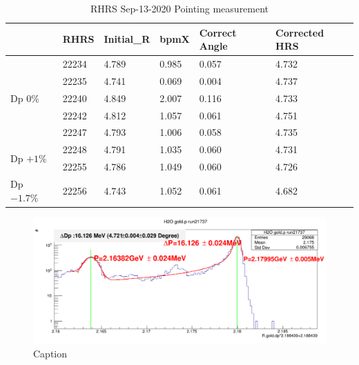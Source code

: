 \begin{table}[!ht]
    \caption{RHRS Sep-13-2020 Pointing measurement}
    \centering
    \begin{tabular}{|l|l|l|l|l|l|}
    \hline
        ~ & RHRS & Initial\_R & bpmX & Correct Angle & Corrected HRS \\ \hline
        \multirow{5}{5em}{Dp $0\%$} & 22234 & 4.789 & 0.985 & 0.057 & 4.732 \\ 
        ~ & 22235 & 4.741 & 0.069 & 0.004 & 4.737 \\ 
        ~ & 22240 & 4.849 & 2.007 & 0.116 & 4.733 \\ 
        ~ & 22242 & 4.812 & 1.057 & 0.061 & 4.751 \\  
        ~ & 22247 & 4.793 & 1.006 & 0.058 & 4.735 \\ \hline
        \multirow{2}{5em}{Dp $+1\%$} & 22248 & 4.791 & 1.035 & 0.060 & 4.731 \\ 
        ~ & 22255 & 4.786 & 1.049 & 0.060 & 4.726 \\ \hline
        \multirow{1}{5em}{Dp $-1.7\%$} & 22256 & 4.743 & 1.052 & 0.061 & 4.682 \\ \hline
    \end{tabular}
    \label{table:crex_3_pointing_rhrs}
\end{table}

\begin{figure}[h]
    \centering
    \includegraphics[width =\textwidth]{images/chap4/pointing_h20_spectrum.png}
    \caption{Caption}
    \label{fig:pointing_h2o_spectrum}
\end{figure}


